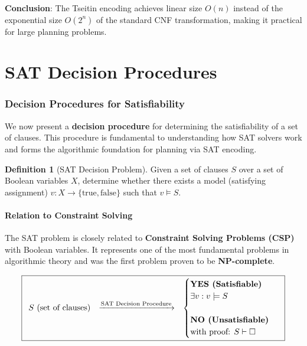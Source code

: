 \documentclass[11pt,a4paper]{article}
\theoremstyle{definition}
\newtheorem{definition}{Definition}[section]
\theoremstyle{plain}
\theoremstyle{remark}
\begin{document}
\textbf{Conclusion}: The Tseitin encoding achieves linear size $O(n)$ instead of the exponential size $O(2^n)$ of the standard CNF transformation, making it practical for large planning problems.


\newpage
\part{SAT Decision Procedures}

\section{Decision Procedures for Satisfiability}

We now present a \textbf{decision procedure} for determining the satisfiability of a set of clauses. This procedure is fundamental to understanding how SAT solvers work and forms the algorithmic foundation for planning via SAT encoding.

\begin{tcolorbox}[colback=blue!5!white,colframe=blue!75!black,title=\textbf{SAT Decision Problem}]
\begin{definition}[SAT Decision Problem]
Given a set of clauses $S$ over a set of Boolean variables $X$, determine whether there exists a model (satisfying assignment) $v: X \rightarrow \{\text{true}, \text{false}\}$ such that $v \models S$.
\end{definition}
\end{tcolorbox}

\subsection{Relation to Constraint Solving}

The SAT problem is closely related to \textbf{Constraint Solving Problems (CSP)} with Boolean variables. It represents one of the most fundamental problems in algorithmic theory and was the first problem proven to be \textbf{NP-complete}.

\[
\boxed{
\begin{array}{ccc}
S \text{ (set of clauses)} & \xrightarrow{\text{SAT Decision Procedure}} &
\begin{cases}
\text{\textbf{YES (Satisfiable)}} \\
\exists v: v \models S \\
\\
\text{\textbf{NO (Unsatisfiable)}} \\
\text{with proof: } S \vdash \Box
\end{cases}
\end{array}
}
\]
\end{document}
